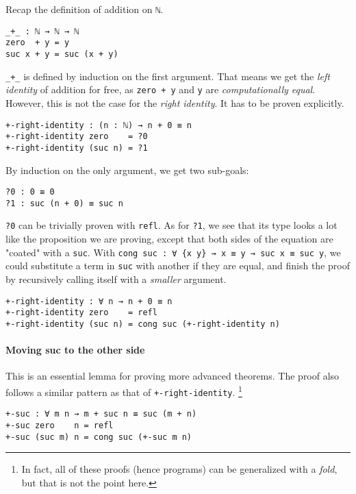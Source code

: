 \documentclass[../thesis.tex]{subfiles}
\begin{document}
Recap the definition of addition on {\lstinline|ℕ|}.

\begin{lstlisting}
_+_ : ℕ → ℕ → ℕ
zero  + y = y
suc x + y = suc (x + y)
\end{lstlisting}

{\lstinline|_+_|} is defined by induction on the first argument. That means we
get the \textit{left identity} of addition for free, as {\lstinline|zero + y|}
and {\lstinline|y|} are \textit{computationally equal}. However, this is not the
case for the \textit{right identity}. It has to be proven explicitly.

\begin{lstlisting}
+-right-identity : (n : ℕ) → n + 0 ≡ n
+-right-identity zero    = ?0
+-right-identity (suc n) = ?1
\end{lstlisting}

By induction on the only argument, we get two sub-goals:

\begin{lstlisting}
?0 : 0 ≡ 0
?1 : suc (n + 0) ≡ suc n
\end{lstlisting}

{\lstinline|?0|} can be trivially proven with {\lstinline|refl|}.
As for {\lstinline|?1|}, we see that its type looks a lot like the proposition
we are proving, except that both sides of the equation are "coated" with a {\lstinline|suc|}.
With {\lstinline|cong suc : ∀ {x y} → x ≡ y → suc x ≡ suc y|}, we could substitute
a term in {\lstinline|suc|} with another if they are equal, and finish
the proof by recursively calling itself with a \textit{smaller} argument.

\begin{lstlisting}
+-right-identity : ∀ n → n + 0 ≡ n
+-right-identity zero    = refl
+-right-identity (suc n) = cong suc (+-right-identity n)
\end{lstlisting}

\paragraph{Moving suc to the other side}

This is an essential lemma for proving more advanced theorems.
The proof also follows a similar pattern as that of {\lstinline|+-right-identity|}.
\footnote{In fact, all of these proofs (hence programs) can be generalized with
a \textit{fold}, but that is not the point here.}

\begin{lstlisting}
+-suc : ∀ m n → m + suc n ≡ suc (m + n)
+-suc zero    n = refl
+-suc (suc m) n = cong suc (+-suc m n)
\end{lstlisting}
\end{document}
